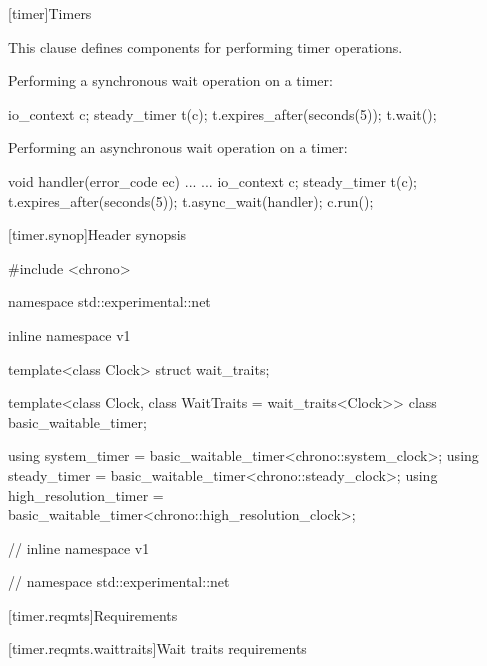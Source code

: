 
[timer]{Timers}

\pnum
This clause defines components for performing timer operations.

\pnum
\begin{example} Performing a synchronous wait operation on a timer:
\begin{codeblock}
io_context c;
steady_timer t(c);
t.expires_after(seconds(5));
t.wait();
\end{codeblock}
 \end{example}

\pnum
\begin{example} Performing an asynchronous wait operation on a timer:
\begin{codeblock}
void handler(error_code ec) { ... }
...
io_context c;
steady_timer t(c);
t.expires_after(seconds(5));
t.async_wait(handler);
c.run();
\end{codeblock}
 \end{example}


%
[timer.synop]{Header  synopsis}

\begin{codeblock}
#include <chrono>

namespace std::experimental::net {
inline namespace v1 {

  template<class Clock> struct wait_traits;

  template<class Clock, class WaitTraits = wait_traits<Clock>>
    class basic_waitable_timer;

  using system_timer = basic_waitable_timer<chrono::system_clock>;
  using steady_timer = basic_waitable_timer<chrono::steady_clock>;
  using high_resolution_timer = basic_waitable_timer<chrono::high_resolution_clock>;

} // inline namespace v1
} // namespace std::experimental::net
\end{codeblock}



[timer.reqmts]{Requirements}


[timer.reqmts.waittraits]{Wait traits requirements}

